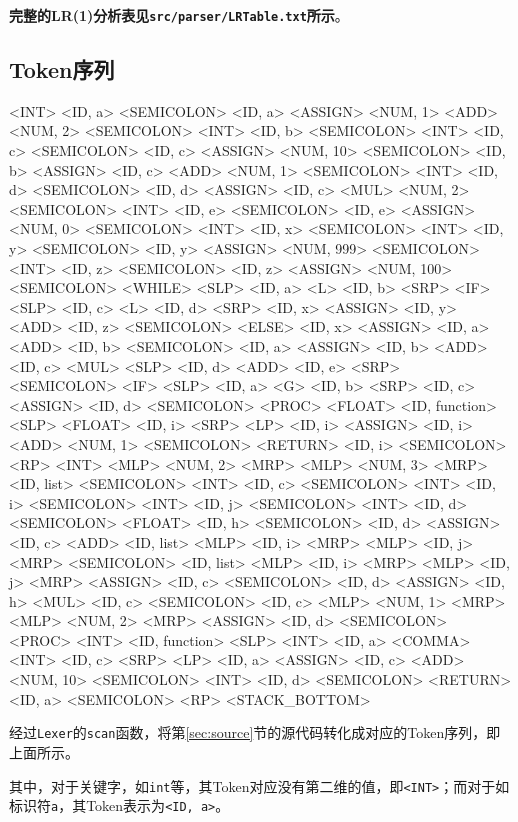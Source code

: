 \documentclass{ML}
\begin{document}
\textbf{完整的LR(1)分析表见\texttt{src/parser/LRTable.txt}所示}。
\subsection{Token序列}\label{sec:token}
\begin{multicols}{4}
\begin{textcode}
<INT>
<ID, a>
<SEMICOLON>
<ID, a>
<ASSIGN>
<NUM, 1>
<ADD>
<NUM, 2>
<SEMICOLON>
<INT>
<ID, b>
<SEMICOLON>
<INT>
<ID, c>
<SEMICOLON>
<ID, c>
<ASSIGN>
<NUM, 10>
<SEMICOLON>
<ID, b>
<ASSIGN>
<ID, c>
<ADD>
<NUM, 1>
<SEMICOLON>
<INT>
<ID, d>
<SEMICOLON>
<ID, d>
<ASSIGN>
<ID, c>
<MUL>
<NUM, 2>
<SEMICOLON>
<INT>
<ID, e>
<SEMICOLON>
<ID, e>
<ASSIGN>
<NUM, 0>
<SEMICOLON>
<INT>
<ID, x>
<SEMICOLON>
<INT>
<ID, y>
<SEMICOLON>
<ID, y>
<ASSIGN>
<NUM, 999>
<SEMICOLON>
<INT>
<ID, z>
<SEMICOLON>
<ID, z>
<ASSIGN>
<NUM, 100>
<SEMICOLON>
<WHILE>
<SLP>
<ID, a>
<L>
<ID, b>
<SRP>
<IF>
<SLP>
<ID, c>
<L>
<ID, d>
<SRP>
<ID, x>
<ASSIGN>
<ID, y>
<ADD>
<ID, z>
<SEMICOLON>
<ELSE>
<ID, x>
<ASSIGN>
<ID, a>
<ADD>
<ID, b>
<SEMICOLON>
<ID, a>
<ASSIGN>
<ID, b>
<ADD>
<ID, c>
<MUL>
<SLP>
<ID, d>
<ADD>
<ID, e>
<SRP>
<SEMICOLON>
<IF>
<SLP>
<ID, a>
<G>
<ID, b>
<SRP>
<ID, c>
<ASSIGN>
<ID, d>
<SEMICOLON>
<PROC>
<FLOAT>
<ID, function>
<SLP>
<FLOAT>
<ID, i>
<SRP>
<LP>
<ID, i>
<ASSIGN>
<ID, i>
<ADD>
<NUM, 1>
<SEMICOLON>
<RETURN>
<ID, i>
<SEMICOLON>
<RP>
<INT>
<MLP>
<NUM, 2>
<MRP>
<MLP>
<NUM, 3>
<MRP>
<ID, list>
<SEMICOLON>
<INT>
<ID, c>
<SEMICOLON>
<INT>
<ID, i>
<SEMICOLON>
<INT>
<ID, j>
<SEMICOLON>
<INT>
<ID, d>
<SEMICOLON>
<FLOAT>
<ID, h>
<SEMICOLON>
<ID, d>
<ASSIGN>
<ID, c>
<ADD>
<ID, list>
<MLP>
<ID, i>
<MRP>
<MLP>
<ID, j>
<MRP>
<SEMICOLON>
<ID, list>
<MLP>
<ID, i>
<MRP>
<MLP>
<ID, j>
<MRP>
<ASSIGN>
<ID, c>
<SEMICOLON>
<ID, d>
<ASSIGN>
<ID, h>
<MUL>
<ID, c>
<SEMICOLON>
<ID, c>
<MLP>
<NUM, 1>
<MRP>
<MLP>
<NUM, 2>
<MRP>
<ASSIGN>
<ID, d>
<SEMICOLON>
<PROC>
<INT>
<ID, function>
<SLP>
<INT>
<ID, a>
<COMMA>
<INT>
<ID, c>
<SRP>
<LP>
<ID, a>
<ASSIGN>
<ID, c>
<ADD>
<NUM, 10>
<SEMICOLON>
<INT>
<ID, d>
<SEMICOLON>
<RETURN>
<ID, a>
<SEMICOLON>
<RP>
<STACK\_BOTTOM>
\end{textcode}
\end{multicols}
经过\texttt{Lexer}的\texttt{scan}函数，将第\ref{sec:source}节的源代码转化成对应的Token序列，即上面所示。

其中，对于关键字，如\texttt{int}等，其Token对应没有第二维的值，即\texttt{<INT>}；而对于如标识符\texttt{a}，其Token表示为\texttt{<ID, a>}。
\end{document}
